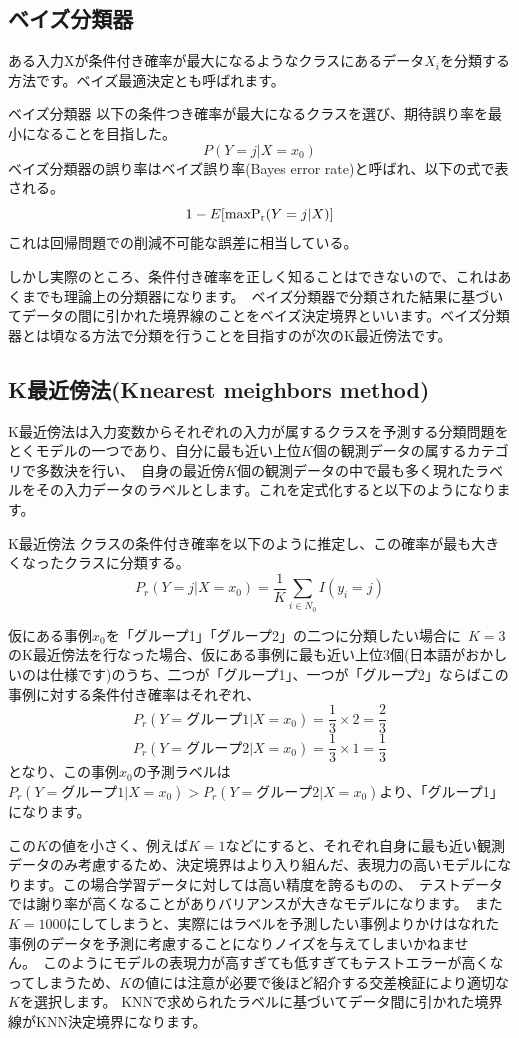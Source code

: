 \documentclass[uplatex]{jsarticle}
\begin{document}
\subsection{ベイズ分類器}
ある入力Xが条件付き確率が最大になるようなクラスにあるデータ$X_i$を分類する方法です。ベイズ最適決定とも呼ばれます。
\begin{itembox}[l]{ベイズ分類器}
  以下の条件つき確率が最大になるクラスを選び、期待誤り率を最小になることを目指した。
  $$P(Y = j|X = x_0)$$
  ベイズ分類器の誤り率はベイズ誤り率(Bayes error rate)と呼ばれ、以下の式で表される。\
  $$1 - E[{\rm max P_r}(Y = j|X)]$$
  これは回帰問題での削減不可能な誤差に相当している。
\end{itembox}
しかし実際のところ、条件付き確率を正しく知ることはできないので、これはあくまでも理論上の分類器になります。\
ベイズ分類器で分類された結果に基づいてデータの間に引かれた境界線のことをベイズ決定境界といいます。ベイズ分類器とは頃なる方法で分類を行うことを目指すのが次のK最近傍法です。

\subsection{K最近傍法(Knearest meighbors method)}
K最近傍法は入力変数からそれぞれの入力が属するクラスを予測する分類問題をとくモデルの一つであり、自分に最も近い上位$K$個の観測データの属するカテゴリで多数決を行い、\
自身の最近傍$K$個の観測データの中で最も多く現れたラベルをその入力データのラベルとします。これを定式化すると以下のようになります。
\begin{itembox}[l]{K最近傍法}
  クラスの条件付き確率を以下のように推定し、この確率が最も大きくなったクラスに分類する。
    $$P_r(Y = j|X = x_0) = \frac{1}{K}\sum_{i \in N_0} I(y_i = j)$$
\end{itembox}
仮にある事例$x_0$を「グループ1」「グループ2」の二つに分類したい場合に\
$K=3$のK最近傍法を行なった場合、仮にある事例に最も近い上位3個(日本語がおかしいのは仕様です)のうち、二つが「グループ1」、一つが「グループ2」ならばこの事例に対する条件付き確率はそれぞれ、\
$$P_r(Y=グループ1 | X = x_0) = \frac{1}{3}\times2 = \frac{2}{3}$$
$$P_r(Y=グループ2 | X = x_0) = \frac{1}{3}\times1 = \frac{1}{3}$$
となり、この事例$x_0$の予測ラベルは$P_r(Y=グループ1 | X = x_0) > P_r(Y=グループ2 | X = x_0)$より、「グループ1」になります。

この$K$の値を小さく、例えば$K = 1$などにすると、それぞれ自身に最も近い観測データのみ考慮するため、決定境界はより入り組んだ、表現力の高いモデルになります。この場合学習データに対しては高い精度を誇るものの、\
テストデータでは謝り率が高くなることがありバリアンスが大きなモデルになります。\
また$K = 1000$にしてしまうと、実際にはラベルを予測したい事例よりかけはなれた事例のデータを予測に考慮することになりノイズを与えてしまいかねません。\
このようにモデルの表現力が高すぎても低すぎてもテストエラーが高くなってしまうため、$K$の値には注意が必要で後ほど紹介する交差検証により適切な$K$を選択します。
KNNで求められたラベルに基づいてデータ間に引かれた境界線がKNN決定境界になります。\
\end{document}
